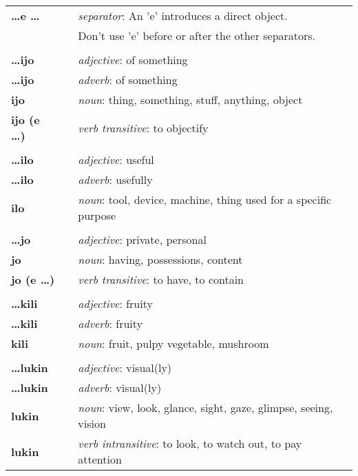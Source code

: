\begin{supertabular}{p{2,5cm}|ll}
\textbf{\dots e \dots} && \textit{separator}: An 'e' introduces a direct object. \\ && Don't use 'e' before or after the other separators. \\ %
 && \\ %
\textbf{\dots ijo} && \textit{adjective}: of something \\ %
\textbf{\dots ijo} && \textit{adverb}: of something \\ %
\textbf{ijo} && \textit{noun}: thing, something, stuff, anything, object \\ %
\textbf{ijo (e \dots)} && \textit{verb transitive}: to objectify \\ %
 && \\ %
\textbf{\dots ilo} && \textit{adjective}: useful \\ %
\textbf{\dots ilo} && \textit{adverb}: usefully \\ %
\textbf{ilo} && \textit{noun}: tool, device, machine, thing used for a specific purpose \\ %
 && \\ %
\textbf{\dots jo} && \textit{adjective}: private, personal \\ %
\textbf{jo} && \textit{noun}: having, possessions, content \\ %
\textbf{jo (e \dots)} && \textit{verb transitive}: to have, to contain \\ %
 && \\ %
\textbf{\dots kili} && \textit{adjective}: fruity \\ %
\textbf{\dots kili} && \textit{adverb}: fruity \\ %
\textbf{kili} && \textit{noun}: fruit, pulpy vegetable, mushroom \\ %
 && \\ %
\textbf{\dots lukin} && \textit{adjective}: visual(ly) \\ %
\textbf{\dots lukin} && \textit{adverb}: visual(ly) \\ %
\textbf{lukin} && \textit{noun}: view, look, glance, sight, gaze, glimpse, seeing, vision \\ %
\textbf{lukin} && \textit{verb intransitive}: to look, to watch out, to pay attention \\ %

\end{supertabular}
